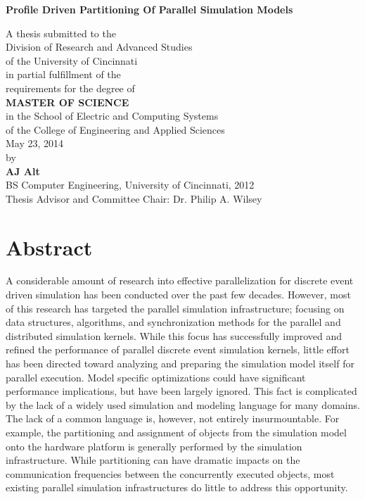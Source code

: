 \documentclass[11pt]{book}
\begin{document}
\thispagestyle{empty}

\doublespacing

\vspace*{0.5in}

\begin{center}
\LARGE{\textbf{Profile Driven Partitioning Of Parallel Simulation Models}}

\vspace*{0.4in}

  {\large A thesis submitted to the\\[0.20in]
    Division of Research and Advanced Studies\\
    of the University of Cincinnati\\[0.20in]
    in partial fulfillment of the\\
    requirements for the degree of\\[0.20in]
    {\bf MASTER OF SCIENCE}\\[0.20in]
    in the School of Electric and Computing Systems\\
    of the College of Engineering and Applied Sciences\\[0.20in]
    May 23, 2014\\[0.20in]
    by\\[0.20in]
    {\bf AJ Alt}\\
    BS Computer Engineering, University of Cincinnati, 2012\\}
  \vspace{0.5in}
  {\large Thesis Advisor and Committee Chair:  Dr. Philip A. Wilsey}
\end{center}

\clearpage

\setcounter{page}{1}
\clearpage

\chapter*{Abstract} 

A considerable amount of research into effective parallelization for discrete event driven simulation has been conducted over the past few decades. However, most of this research has targeted the parallel simulation infrastructure; focusing on data structures, algorithms, and synchronization methods for the parallel and distributed simulation kernels. While this focus has successfully improved and refined the performance of parallel discrete event simulation kernels, little effort has been directed toward analyzing and preparing the simulation model itself for parallel execution. Model specific optimizations could have significant performance implications, but have been largely ignored. This fact is complicated by the lack of a widely used simulation and modeling language for many domains. The lack of a common language is, however, not entirely insurmountable. For example, the partitioning and assignment of objects from the simulation model onto the hardware platform is generally performed by the simulation infrastructure. While partitioning can have dramatic impacts on the communication frequencies between the concurrently executed objects, most existing parallel simulation infrastructures do little to address this opportunity.
\end{document}
